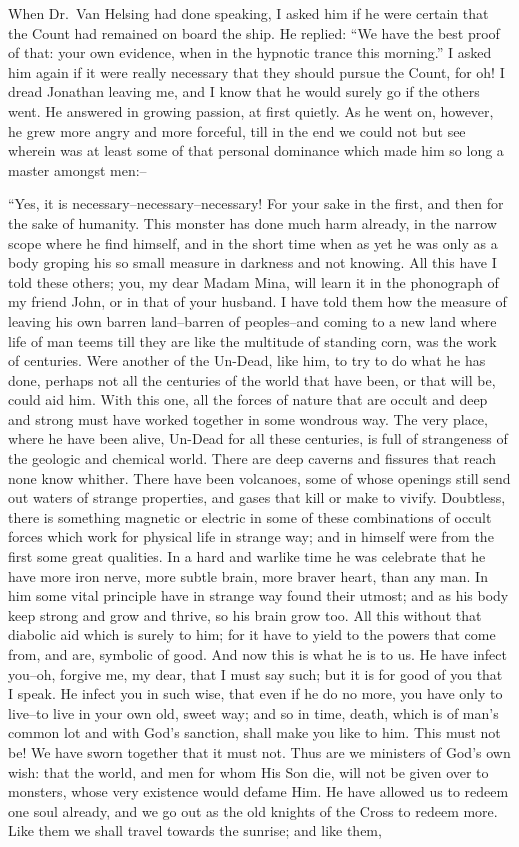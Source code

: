 \documentclass[12pt,openright]{book}
\begin{document}
When Dr. Van Helsing had done speaking, I asked him if he were certain that the Count had remained on board the ship. He replied: “We have the best proof of that: your own evidence, when in the hypnotic trance this morning.” I asked him again if it were really necessary that they should pursue the Count, for oh! I dread Jonathan leaving me, and I know that he would surely go if the others went. He answered in growing passion, at first quietly. As he went on, however, he grew more angry and more forceful, till in the end we could not but see wherein was at least some of that personal dominance which made him so long a master amongst men:–

“Yes, it is necessary–necessary–necessary! For your sake in the first, and then for the sake of humanity. This monster has done much harm already, in the narrow scope where he find himself, and in the short time when as yet he was only as a body groping his so small measure in darkness and not knowing. All this have I told these others; you, my dear Madam Mina, will learn it in the phonograph of my friend John, or in that of your husband. I have told them how the measure of leaving his own barren land–barren of peoples–and coming to a new land where life of man teems till they are like the multitude of standing corn, was the work of centuries. Were another of the Un-Dead, like him, to try to do what he has done, perhaps not all the centuries of the world that have been, or that will be, could aid him. With this one, all the forces of nature that are occult and deep and strong must have worked together in some wondrous way. The very place, where he have been alive, Un-Dead for all these centuries, is full of strangeness of the geologic and chemical world. There are deep caverns and fissures that reach none know whither. There have been volcanoes, some of whose openings still send out waters of strange properties, and gases that kill or make to vivify. Doubtless, there is something magnetic or electric in some of these combinations of occult forces which work for physical life in strange way; and in himself were from the first some great qualities. In a hard and warlike time he was celebrate that he have more iron nerve, more subtle brain, more braver heart, than any man. In him some vital principle have in strange way found their utmost; and as his body keep strong and grow and thrive, so his brain grow too. All this without that diabolic aid which is surely to him; for it have to yield to the powers that come from, and are, symbolic of good. And now this is what he is to us. He have infect you–oh, forgive me, my dear, that I must say such; but it is for good of you that I speak. He infect you in such wise, that even if he do no more, you have only to live–to live in your own old, sweet way; and so in time, death, which is of man’s common lot and with God’s sanction, shall make you like to him. This must not be! We have sworn together that it must not. Thus are we ministers of God’s own wish: that the world, and men for whom His Son die, will not be given over to monsters, whose very existence would defame Him. He have allowed us to redeem one soul already, and we go out as the old knights of the Cross to redeem more. Like them we shall travel towards the sunrise; and like them, 
\end{document}
